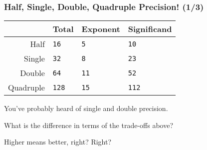 \begin{frame}

\frametitle{Half, Single, Double, Quadruple Precision! (1/3)}

\vspace{\fill}

\begin{center}

\begin{tabular}{r|l|l|l}
& Total & Exponent & Significand \\ \hline
Half & \texttt{16} & \texttt{5} & \texttt{10} \\
Single & \texttt{32} & \texttt{8} & \texttt{23} \\
Double & \texttt{64} & \texttt{11} & \texttt{52} \\
Quadruple & \texttt{128} & \texttt{15} & \texttt{112} \\ \hline
\end{tabular}

\end{center}

\vspace{\fill}

\begin{center}

You've probably heard of single and double precision.

\vspace{\fill}

What is the difference in terms of the trade-offs above?

Higher means better, right? Right?

\end{center}

\vspace{\fill}

\end{frame}


